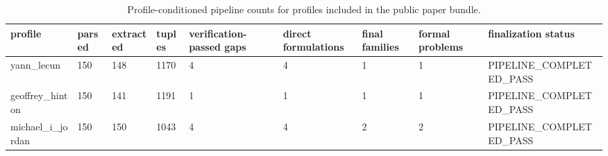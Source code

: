 \begin{table}[t]
\centering
\small
\begin{tabular}{lllllllll}
\toprule
profile & parsed & extracted & tuples & verification-passed gaps & direct formulations & final families & formal problems & finalization status \\
\midrule
yann\_lecun & 150 & 148 & 1170 & 4 & 4 & 1 & 1 & PIPELINE\_COMPLETED\_PASS \\
geoffrey\_hinton & 150 & 141 & 1191 & 1 & 1 & 1 & 1 & PIPELINE\_COMPLETED\_PASS \\
michael\_i\_jordan & 150 & 150 & 1043 & 4 & 4 & 2 & 2 & PIPELINE\_COMPLETED\_PASS \\
\bottomrule
\end{tabular}
\caption{Profile-conditioned pipeline counts for profiles included in the public paper bundle.}
\label{tab:personalized_pipeline_counts}
\end{table}
